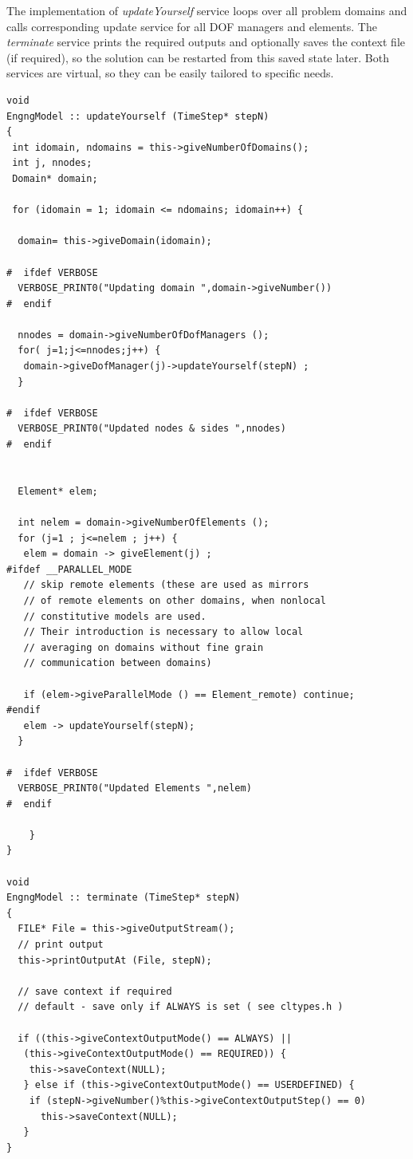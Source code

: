 \documentclass[a4paper]{article}
\newcommand{\service}[1]{{\em #1}}
\begin{document}
The implementation of \service{updateYourself} service loops over all
problem domains and calls corresponding update service for all DOF
managers and elements. The \service{terminate} service prints the
required outputs and optionally saves the
context file (if required), so the solution can be restarted from this
saved state later. Both services are virtual, so they can be easily
tailored to specific needs.

{\small\begin{verbatim}
void
EngngModel :: updateYourself (TimeStep* stepN)
{
 int idomain, ndomains = this->giveNumberOfDomains();
 int j, nnodes;
 Domain* domain;
  
 for (idomain = 1; idomain <= ndomains; idomain++) {

  domain= this->giveDomain(idomain);
		
#  ifdef VERBOSE
  VERBOSE_PRINT0("Updating domain ",domain->giveNumber())
#  endif
			
  nnodes = domain->giveNumberOfDofManagers ();
  for( j=1;j<=nnodes;j++) {
   domain->giveDofManager(j)->updateYourself(stepN) ;
  }
		
#  ifdef VERBOSE
  VERBOSE_PRINT0("Updated nodes & sides ",nnodes)
#  endif
			
			
  Element* elem;
  
  int nelem = domain->giveNumberOfElements ();
  for (j=1 ; j<=nelem ; j++) {
   elem = domain -> giveElement(j) ;
#ifdef __PARALLEL_MODE
   // skip remote elements (these are used as mirrors 
   // of remote elements on other domains, when nonlocal 
   // constitutive models are used. 
   // Their introduction is necessary to allow local 
   // averaging on domains without fine grain 
   // communication between domains)

   if (elem->giveParallelMode () == Element_remote) continue;
#endif
   elem -> updateYourself(stepN);
  }
		
#  ifdef VERBOSE
  VERBOSE_PRINT0("Updated Elements ",nelem)
#  endif
			
	}
}

void 
EngngModel :: terminate (TimeStep* stepN)
{
  FILE* File = this->giveOutputStream();
  // print output
  this->printOutputAt (File, stepN);

  // save context if required
  // default - save only if ALWAYS is set ( see cltypes.h )
		
  if ((this->giveContextOutputMode() == ALWAYS) ||
   (this->giveContextOutputMode() == REQUIRED)) {
    this->saveContext(NULL);
   } else if (this->giveContextOutputMode() == USERDEFINED) {
    if (stepN->giveNumber()%this->giveContextOutputStep() == 0) 
      this->saveContext(NULL);
   }
}
\end{verbatim}}
\end{document}

